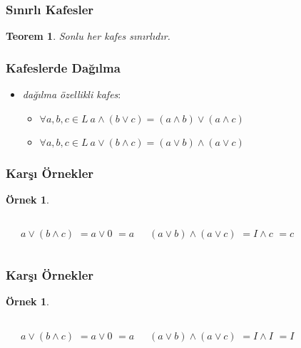 \documentclass[dvipsnames]{beamer}
\theoremstyle{definition}
\theoremstyle{example}
\newtheorem{ornek}[theorem]{Örnek}
\theoremstyle{plain}
\newtheorem{teorem}[theorem]{Teorem}
\begin{document}
\begin{frame}
  \frametitle{Sınırlı Kafesler}

  \begin{teorem}
    Sonlu her kafes sınırlıdır.
  \end{teorem}
\end{frame}

\begin{frame}
  \frametitle{Kafeslerde Dağılma}

  \begin{itemize}
    \item \emph{dağılma özellikli kafes}:
    \begin{itemize}
      \item $\forall a,b,c \in L~a \wedge (b \vee c) = (a \wedge b) \vee (a \wedge c)$
      \item $\forall a,b,c \in L~a \vee (b \wedge c) = (a \vee b) \wedge (a \vee c)$
    \end{itemize}
  \end{itemize}
\end{frame}

\begin{frame}
  \frametitle{Karşı Örnekler}

  \begin{ornek}
    \begin{columns}
      \begin{center}
      \end{center}

      \pause
      $a \vee (b \wedge c)$ \pause $= a \vee 0$ \pause $= a$

      \pause
      $(a \vee b) \wedge (a \vee c)$ \pause $= I \wedge c$ \pause $= c$
    \end{columns}
  \end{ornek}
\end{frame}

\begin{frame}
  \frametitle{Karşı Örnekler}

  \begin{ornek}
    \begin{columns}
      \begin{center}
      \end{center}

      \pause
      $a \vee (b \wedge c)$ \pause $= a \vee 0$ \pause $= a$

      \pause
      $(a \vee b) \wedge (a \vee c)$ \pause $= I \wedge I$ \pause $= I$
    \end{columns}
  \end{ornek}
\end{frame}
\end{document}
